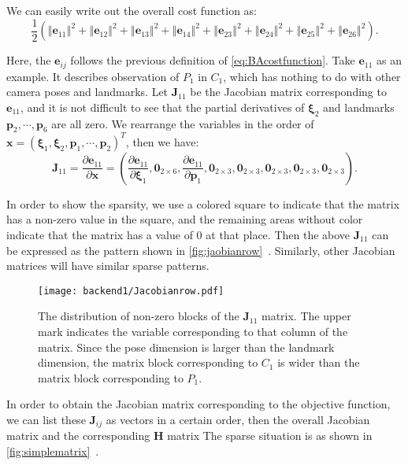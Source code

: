 We can easily write out the overall cost function as: 
\begin{equation}
	\frac{1}{2}\left( \left\Vert \mathbf{e}_{11} \right\Vert^2 + 
	\left\Vert \mathbf{e}_{12} \right\Vert^2 + 
	\left\Vert \mathbf{e}_{13} \right\Vert^2 + 
	\left\Vert \mathbf{e}_{14} \right\Vert^2 + 
	\left\Vert \mathbf{e}_{23} \right\Vert^2 + 
	\left\Vert \mathbf{e}_{24} \right\Vert^2 + 
	\left\Vert \mathbf{e}_{25} \right\Vert^2 + 
	\left\Vert \mathbf{e}_{26} \right\Vert^2 
	\right).
\end{equation}

Here, the $\mathbf{e}_{ij}$ follows the previous definition of \eqref{eq:BAcostfunction}. Take $\mathbf{e}_{11}$ as an example. It describes observation of $P_1$ in $C_1$, which has nothing to do with other camera poses and landmarks. Let $\mathbf{J}_{11}$ be the Jacobian matrix corresponding to $\mathbf{e}_{11}$, and it is not difficult to see that the partial derivatives of $\mathbf{\xi}_2$ and landmarks $\mathbf{p}_2, \cdots, \mathbf{p}_6$ are all zero. We rearrange the variables in the order of $\mathbf{x} = \left( \mathbf{\xi}_1, \mathbf{\xi}_2, \mathbf{p}_1, \cdots, \mathbf{p}_2 \right)^T$,  then we have: 
\begin{equation}
	\mathbf{J}_{11} = \frac{\partial \mathbf{e}_{11}}{\partial \mathbf{x}}
	= \left(
	\frac{\partial \mathbf{e}_{11}}{\partial \mathbf{\xi}_1},
	\mathbf{0}_{2\times 6},
	\frac{\partial \mathbf{e}_{11}}{\partial \mathbf{p}_1},
	\mathbf{0}_{2\times 3},
	\mathbf{0}_{2\times 3},
	\mathbf{0}_{2\times 3},
	\mathbf{0}_{2\times 3},
	\mathbf{0}_{2\times 3}
	\right).
\end{equation}

In order to show the sparsity, we use a colored square to indicate that the matrix has a non-zero value in the square, and the remaining areas without color indicate that the matrix has a value of 0 at that place. Then the above $\mathbf{J}_{11}$ can be expressed as the pattern shown in \autoref{fig:jaobianrow}~. Similarly, other Jacobian matrices will have similar sparse patterns.

\begin{figure}[!t]
	\centering
	\texttt{[image: backend1/Jacobianrow.pdf]}
	\caption{The distribution of non-zero blocks of the $\mathbf{J}_{11}$ matrix. The upper mark indicates the variable corresponding to that column of the matrix. Since the pose dimension is larger than the landmark dimension, the matrix block corresponding to $C_1$ is wider than the matrix block corresponding to $P_1$.}
	\label{fig:jaobianrow}
\end{figure}
In order to obtain the Jacobian matrix corresponding to the objective function, we can list these $\mathbf{J}_{ij}$ as vectors in a certain order, then the overall Jacobian matrix and the corresponding $\mathbf{H}$ matrix The sparse situation is as shown in \autoref{fig:simplematrix}~.

